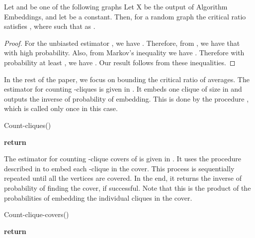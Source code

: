 \documentclass[runningheads,a4paper]{llncs}
\begin{document}
\begin{proposition}\label{prop:app-FK08}
Let  and  be one of the following graphs 
 Let X be the output of Algorithm Embeddings, and let  be a constant. Then, for a random graph  
the critical ratio satisfies , where  such that  as .
\end{proposition}

\begin{proof}
For the unbiasted estimator , we have . Therefore, from , we have that  with high probability.  Also, from Markov's inequality we have .
Therefore with probability at least , we have . Our result follows from these inequalities.
\end{proof}

In the rest of the paper, we focus on bounding the critical ratio of averages. The estimator for counting -cliques is given in . It embeds one clique of size  in  and outputs the inverse of probability of embedding. This is done by the procedure , 
which is called only once in this case.

\begin{algorithm}
\caption{Count-cliques()}\label{alg:app-clique}
\begin{algorithmic}[1]	
\State  {}
\State  {}
\While{}\State \If {} 
	\State  {}
\EndIf\State 
\State {}
\State 
\State 
\EndWhile\label{euclidendwhile}
\State \textbf{return} \label{step:1last}
\EndProcedure
\end{algorithmic}
\end{algorithm}

The estimator for counting -clique covers of  is given in . It uses the procedure  described in  to embed each -clique in the cover. This process is sequentially repeated until all the vertices are covered. 
In the end, it returns the inverse of probability of finding the cover, if successful. Note that this is the product of the probabilities of embedding the individual cliques in the cover. 
\begin{algorithm}
\caption{Count-clique-covers()}\label{alg:app-clique-cover}
\begin{algorithmic}[1]
\State 
\State {}
\State 
\While{}
\State {}
	\State  {}
\EndIf
\State {}
\EndWhile
\State \textbf{return} 
\end{algorithmic}
\end{algorithm}
\end{document}
